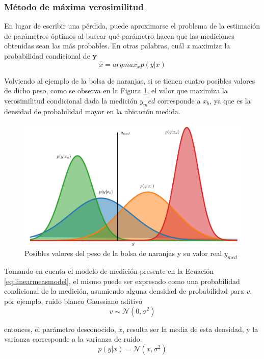 \subsubsection{Método de máxima verosimilitud}

En lugar de escribir una pérdida, puede aproximarse el problema de la estimación de parámetros óptimos al buscar qué parámetro hacen que las mediciones obtenidas sean las más probables. En otras palabras, cuál \textit{x} maximiza la probabilidad condicional de \textbf{y}
\begin{equation}
    \hat{x} = argmax_x p(y|x)
\end{equation}

Volviendo al ejemplo de la bolsa de naranjas, si se tienen cuatro posibles valores de dicho peso, como se observa en la Figura \ref{fig:mostlikelyproba}, el valor que maximiza la verosimilitud condicional dada la medición $y_med$ corresponde a $x_b$, ya que es la densidad de probabilidad mayor en la ubicación medida.
\begin{figure}
    \centering
    \includegraphics[width=\textwidth]{Img/MostLikelyProba.png}
    \caption{Posibles valores del peso de la bolsa de naranjas y su valor real $y_{med}$}
    \label{fig:mostlikelyproba}
\end{figure}

Tomando en cuenta el modelo de medición presente en la Ecuación \ref{eq:linearmeasmodel}, el mismo puede ser expresado como una probabilidad condicional de la medición, asumiendo alguna densidad de probabilidad para $v$, por ejemplo, ruido blanco Gaussiano aditivo
\begin{equation}
    v \sim \mathcal{N}(0,\sigma^2)
\end{equation}

entonces, el parámetro desconocido, $x$, resulta ser la media de esta densidad, y la varianza corresponde a la varianza de ruido.
\begin{equation}
    p(y|x) = \mathcal{N}(x,\sigma^2)
\end{equation}

